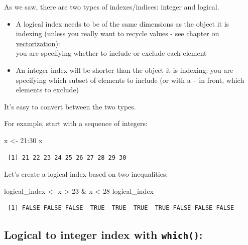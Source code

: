 \documentclass[
]{book}
\makeatletter
\newenvironment{Shaded}{\begin{snugshade}}{\end{snugshade}}
\newcommand{\DecValTok}[1]{\textcolor[rgb]{0.00,0.00,0.81}{#1}}
\newcommand{\NormalTok}[1]{#1}
\newcommand{\OtherTok}[1]{\textcolor[rgb]{0.56,0.35,0.01}{#1}}
\newcommand{\SpecialCharTok}[1]{\textcolor[rgb]{0.00,0.00,0.00}{#1}}
\newenvironment{kframe}{%
\medskip{}
\setlength{\fboxsep}{.8em}
 \def\at@end@of@kframe{}%
 \ifinner\ifhmode%
  \def\at@end@of@kframe{\end{minipage}}%
  \begin{minipage}{\columnwidth}%
 \fi\fi%
 \def\FrameCommand##1{\hskip\@totalleftmargin \hskip-\fboxsep
 \colorbox{shadecolor}{##1}\hskip-\fboxsep
     \hskip-\linewidth \hskip-\@totalleftmargin \hskip\columnwidth}%
 \MakeFramed {\advance\hsize-\width
   \@totalleftmargin\z@ \linewidth\hsize
   \@setminipage}}%
 {\par\unskip\endMakeFramed%
 \at@end@of@kframe}
\newenvironment{rmdblock}[1]
  {
  \begin{itemize}
  \renewcommand{\labelitemi}{
    \raisebox{-.7\height}[0pt][0pt]{
      {\setkeys{Gin}{width=3em,keepaspectratio}\texttt{[image: images/\#1]}}
    }
  }
  \setlength{\fboxsep}{1em}
  \begin{kframe}
  \item
  }
  {
  \end{kframe}
  \end{itemize}
  }
\newenvironment{note}
  {\begin{rmdblock}{note}}
  {\end{rmdblock}}
\makeatother
\begin{document}
As we saw, there are two types of indexes/indices: integer and logical.

\begin{note}
\begin{itemize}
\item
  A logical index needs to be of the same dimensions as the object it is
  indexing (unless you really want to recycle values - see chapter on
  \protect\hyperlink{vectorization}{vectorization}):\\
  you are specifying whether to include or exclude each element
\item
  An integer index will be shorter than the object it is indexing: you
  are specifying which subset of elements to include (or with a
  \texttt{-} in front, which elements to exclude)
\end{itemize}
\end{note}

It's easy to convert between the two types.

For example, start with a sequence of integers:

\begin{Shaded}
\begin{Highlighting}[]
\NormalTok{x }\OtherTok{\textless{}{-}} \DecValTok{21}\SpecialCharTok{:}\DecValTok{30}
\NormalTok{x}
\end{Highlighting}
\end{Shaded}

\begin{verbatim}
 [1] 21 22 23 24 25 26 27 28 29 30
\end{verbatim}

Let's create a logical index based on two inequalities:

\begin{Shaded}
\begin{Highlighting}[]
\NormalTok{logical\_index }\OtherTok{\textless{}{-}}\NormalTok{ x }\SpecialCharTok{\textgreater{}} \DecValTok{23} \SpecialCharTok{\&}\NormalTok{ x }\SpecialCharTok{\textless{}} \DecValTok{28}
\NormalTok{logical\_index}
\end{Highlighting}
\end{Shaded}

\begin{verbatim}
 [1] FALSE FALSE FALSE  TRUE  TRUE  TRUE  TRUE FALSE FALSE FALSE
\end{verbatim}

\hypertarget{logical-to-integer-index-with-which}{%
\subsection{\texorpdfstring{Logical to integer index with \texttt{which()}:}{Logical to integer index with which():}}\label{logical-to-integer-index-with-which}}
\end{document}
